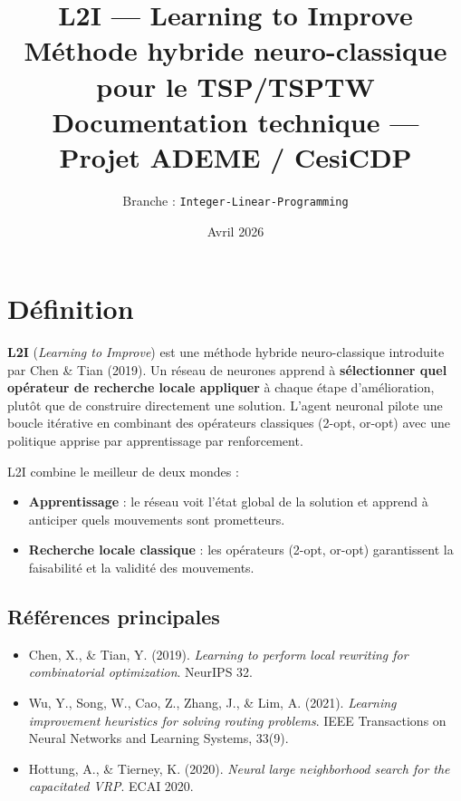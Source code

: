 \documentclass[11pt,a4paper]{article}
\title{%
  \textbf{L2I} --- Learning to Improve\\
  \large Méthode hybride neuro-classique pour le TSP/TSPTW\\[6pt]
  \normalsize Documentation technique --- Projet ADEME / CesiCDP
}
\author{Branche : \texttt{Integer-Linear-Programming}}
\date{Avril 2026}
\begin{document}
\maketitle
\thispagestyle{fancy}
\tableofcontents
\newpage

\section{Définition}

\textbf{L2I} (\textit{Learning to Improve}) est une méthode hybride
neuro-classique introduite par Chen \& Tian (2019). Un réseau de neurones
apprend à \textbf{sélectionner quel opérateur de recherche locale appliquer}
à chaque étape d'amélioration, plutôt que de construire directement une
solution. L'agent neuronal pilote une boucle itérative en combinant des
opérateurs classiques (2-opt, or-opt) avec une politique apprise par
apprentissage par renforcement.

\begin{tcolorbox}[keypoint]
L2I combine le meilleur de deux mondes :
\begin{itemize}
  \item \textcolor{neuralblue}{\textbf{Apprentissage}} : le réseau voit l'état
    global de la solution et apprend à anticiper quels mouvements sont prometteurs.
  \item \textcolor{classicgreen}{\textbf{Recherche locale classique}} : les
    opérateurs (2-opt, or-opt) garantissent la faisabilité et la validité des
    mouvements.
\end{itemize}
\end{tcolorbox}

\subsection*{Références principales}

\begin{itemize}
  \item Chen, X., \& Tian, Y. (2019). \textit{Learning to perform local
    rewriting for combinatorial optimization}. NeurIPS 32.
  \item Wu, Y., Song, W., Cao, Z., Zhang, J., \& Lim, A. (2021).
    \textit{Learning improvement heuristics for solving routing problems}.
    IEEE Transactions on Neural Networks and Learning Systems, 33(9).
  \item Hottung, A., \& Tierney, K. (2020). \textit{Neural large neighborhood
    search for the capacitated VRP}. ECAI 2020.
\end{itemize}
\end{document}
